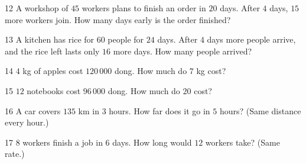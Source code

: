 \gap
\begin{probbox}{12}{\relax}
A workshop of $45$ workers plans to finish an order in $20$ days. After $4$ days, $15$ more workers join. How many days early is the order finished?
\end{probbox}
\gap
\begin{probbox}{13}{\relax}
A kitchen has rice for $60$ people for $24$ days. After $4$ days more people arrive, and the rice left lasts only $16$ more days. How many people arrived?
\end{probbox}
\gap
\begin{probbox}{14}{\relax}
$4$ kg of apples cost $120\,000$ dong. How much do $7$ kg cost?
\end{probbox}
\gap
\begin{probbox}{15}{\relax}
$12$ notebooks cost $96\,000$ dong. How much do $20$ cost?
\end{probbox}
\gap
\begin{probbox}{16}{\relax}
A car covers $135$ km in $3$ hours. How far does it go in $5$ hours? (Same distance every hour.)
\end{probbox}
\gap
\begin{probbox}{17}{\relax}
$8$ workers finish a job in $6$ days. How long would $12$ workers take? (Same rate.)
\end{probbox}
